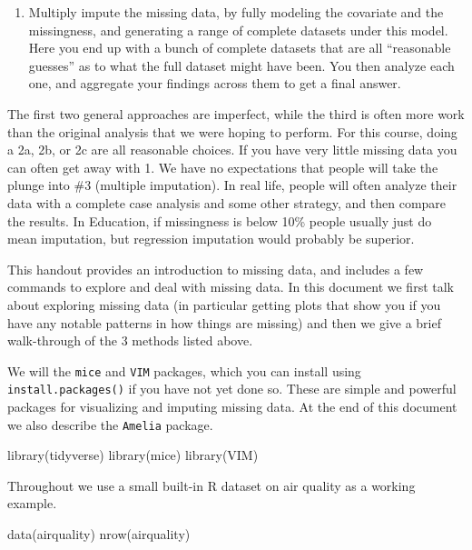 \documentclass[
  letterpaper,
  DIV=11,
  numbers=noendperiod]{scrreprt}
\newenvironment{Shaded}{}{}
\newcommand{\FunctionTok}[1]{\textcolor[rgb]{0.02,0.16,0.49}{#1}}
\newcommand{\NormalTok}[1]{#1}
\providecommand{\tightlist}{%
  \setlength{\itemsep}{0pt}\setlength{\parskip}{0pt}}\usepackage{longtable,booktabs,array}
\begin{document}
\begin{enumerate}
\def\labelenumi{\arabic{enumi}.}
\setcounter{enumi}{2}
\tightlist
\item
  Multiply impute the missing data, by fully modeling the covariate and
  the missingness, and generating a range of complete datasets under
  this model. Here you end up with a bunch of complete datasets that are
  all ``reasonable guesses'' as to what the full dataset might have
  been. You then analyze each one, and aggregate your findings across
  them to get a final answer.
\end{enumerate}

The first two general approaches are imperfect, while the third is often
more work than the original analysis that we were hoping to perform. For
this course, doing a 2a, 2b, or 2c are all reasonable choices. If you
have very little missing data you can often get away with 1. We have no
expectations that people will take the plunge into \#3 (multiple
imputation). In real life, people will often analyze their data with a
complete case analysis and some other strategy, and then compare the
results. In Education, if missingness is below 10\% people usually just
do mean imputation, but regression imputation would probably be
superior.

This handout provides an introduction to missing data, and includes a
few commands to explore and deal with missing data. In this document we
first talk about exploring missing data (in particular getting plots
that show you if you have any notable patterns in how things are
missing) and then we give a brief walk-through of the 3 methods listed
above.

We will the \texttt{mice} and \texttt{VIM} packages, which you can
install using \texttt{install.packages()} if you have not yet done so.
These are simple and powerful packages for visualizing and imputing
missing data. At the end of this document we also describe the
\texttt{Amelia} package.

\begin{Shaded}
\begin{Highlighting}[]
\FunctionTok{library}\NormalTok{(tidyverse)}
\FunctionTok{library}\NormalTok{(mice)}
\FunctionTok{library}\NormalTok{(VIM)}
\end{Highlighting}
\end{Shaded}

Throughout we use a small built-in R dataset on air quality as a working
example.

\begin{Shaded}
\begin{Highlighting}[]
  \FunctionTok{data}\NormalTok{(airquality)}
  \FunctionTok{nrow}\NormalTok{(airquality)}
\end{Highlighting}
\end{Shaded}
\end{document}
